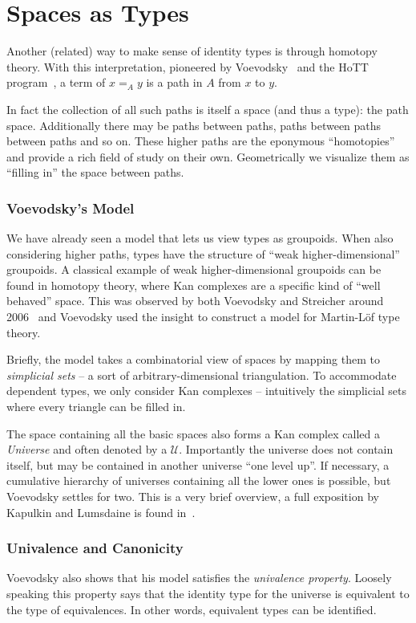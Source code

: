 \section{Spaces as Types}\label{sec:spaces}

Another (related) way to make sense of identity types is through homotopy theory. With
this interpretation, pioneered by Voevodsky~\cite{voevodsky2014} and the HoTT
program~\cite{hottbook}, a term of $x =_A y$ is a path in $A$ from $x$ to
$y$.

In fact the collection of all such paths is itself a space (and thus a type):
the path space. Additionally there may be paths between paths, paths between
paths between paths and so on. These higher paths are the eponymous
``homotopies'' and provide a rich field of study on their own.
Geometrically we visualize them as ``filling in'' the space between paths.

\subsubsection{Voevodsky's Model}
We have already seen a model that lets us view types as groupoids. When also
considering higher paths, types have the structure of ``weak higher-dimensional''
groupoids. A classical example of weak higher-dimensional groupoids can be found
in homotopy theory, where Kan complexes are a specific kind of ``well
behaved'' space. This was observed by both Voevodsky and Streicher around
2006~\cite{streicher2014sset} and Voevodsky used the insight to construct a
model for Martin-L\"of type theory.

Briefly, the model takes a combinatorial view of spaces by mapping them to
\emph{simplicial sets} -- a sort of arbitrary-dimensional triangulation. To
accommodate dependent types, we only consider Kan complexes -- intuitively the
simplicial sets where every triangle can be filled in.

The space containing all the basic spaces also forms a Kan complex
called a \emph{Universe} and often denoted by a $\mathcal{U}$.
Importantly the universe does not contain itself, but
may be contained in another universe ``one level up''. If necessary, a
cumulative hierarchy of universes containing all the lower ones is possible, but
Voevodsky settles for two. This is a very brief overview, a full exposition by
Kapulkin and Lumsdaine is found in~\cite{kapulkin2012}.

\subsubsection{Univalence and Canonicity}%
Voevodsky also shows that his model satisfies the \emph{univalence property}.
Loosely speaking this property says that the identity type for the universe is
equivalent to the type of equivalences. In other words, equivalent types can be
identified.

